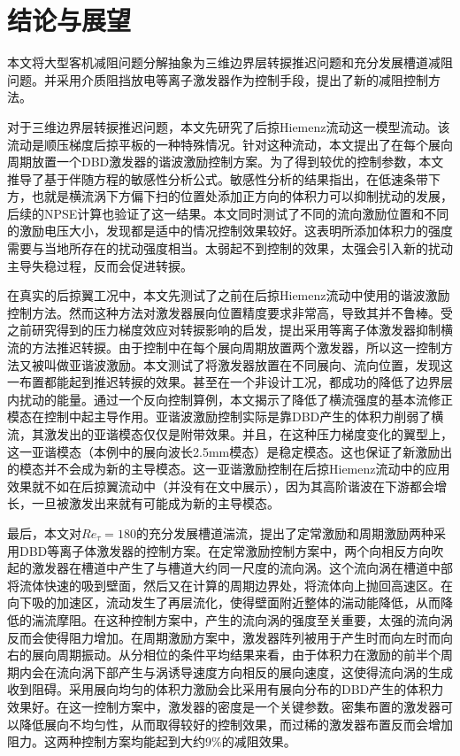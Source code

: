 \chapter{结论与展望}
本文将大型客机减阻问题分解抽象为三维边界层转捩推迟问题和充分发展槽道减阻问题。并采用介质阻挡放电等离子激发器作为控制手段，提出了新的减阻控制方法。

对于三维边界层转捩推迟问题，本文先研究了后掠Hiemenz流动这一模型流动。该流动是顺压梯度后掠平板的一种特殊情况。针对这种流动，本文提出了在每个展向周期放置一个DBD激发器的谐波激励控制方案。为了得到较优的控制参数，本文推导了基于伴随方程的敏感性分析公式。敏感性分析的结果指出，在低速条带下方，也就是横流涡下方偏下扫的位置处添加正方向的体积力可以抑制扰动的发展，后续的NPSE计算也验证了这一结果。本文同时测试了不同的流向激励位置和不同的激励电压大小，发现都是适中的情况控制效果较好。这表明所添加体积力的强度需要与当地所存在的扰动强度相当。太弱起不到控制的效果，太强会引入新的扰动主导失稳过程，反而会促进转捩。

在真实的后掠翼工况中，本文先测试了之前在后掠Hiemenz流动中使用的谐波激励控制方法。然而这种方法对激发器展向位置精度要求非常高，导致其并不鲁棒。受之前研究得到的压力梯度效应对转捩影响的启发，提出采用等离子体激发器抑制横流的方法推迟转捩。由于控制中在每个展向周期放置两个激发器，所以这一控制方法又被叫做亚谐波激励。本文测试了将激发器放置在不同展向、流向位置，发现这一布置都能起到推迟转捩的效果。甚至在一个非设计工况，都成功的降低了边界层内扰动的能量。通过一个反向控制算例，本文揭示了降低了横流强度的基本流修正模态在控制中起主导作用。亚谐波激励控制实际是靠DBD产生的体积力削弱了横流，其激发出的亚谐模态仅仅是附带效果。并且，在这种压力梯度变化的翼型上，这一亚谐模态（本例中的展向波长2.5mm模态）是稳定模态。这也保证了新激励出的模态并不会成为新的主导模态。这一亚谐激励控制在后掠Hiemenz流动中的应用效果就不如在后掠翼流动中（并没有在文中展示），因为其高阶谐波在下游都会增长，一旦被激发出来就有可能成为新的主导模态。

最后，本文对$Re_\tau=180$的充分发展槽道湍流，提出了定常激励和周期激励两种采用DBD等离子体激发器的控制方案。在定常激励控制方案中，两个向相反方向吹起的激发器在槽道中产生了与槽道大约同一尺度的流向涡。这个流向涡在槽道中部将流体快速的吸到壁面，然后又在计算的周期边界处，将流体向上抛回高速区。在向下吸的加速区，流动发生了再层流化，使得壁面附近整体的湍动能降低，从而降低的湍流摩阻。在这种控制方案中，产生的流向涡的强度至关重要，太强的流向涡反而会使得阻力增加。在周期激励方案中，激发器阵列被用于产生时而向左时而向右的展向周期振动。从分相位的条件平均结果来看，由于体积力在激励的前半个周期内会在流向涡下部产生与涡诱导速度方向相反的展向速度，这使得流向涡的生成收到阻碍。采用展向均匀的体积力激励会比采用有展向分布的DBD产生的体积力效果好。在这一控制方案中，激发器的密度是一个关键参数。密集布置的激发器可以降低展向不均匀性，从而取得较好的控制效果，而过稀的激发器布置反而会增加阻力。这两种控制方案均能起到大约9\%的减阻效果。


